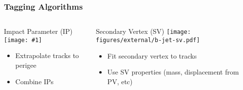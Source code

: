 \documentclass[usenames,dvipsnames]{beamer}
\newcommand{\widegraphic}[1]{\texttt{[image: \#1]}}
\begin{document}
\begin{frame}
  \frametitle{Tagging Algorithms}
  \begin{columns}[t]
    \begin{column}{0.5\textwidth}
      \begin{center}
        Impact Parameter (IP)
      \widegraphic{figures/external/b-jet-ip.pdf}
      \end{center}
      \begin{itemize}
      \item Extrapolate tracks to perigee
      \item Combine IPs
      \end{itemize}
    \end{column}
    \vline{}
    \begin{column}{0.5\textwidth}
      \begin{center}
        Secondary Vertex (SV)
      \texttt{[image: figures/external/b-jet-sv.pdf]}
        \end{center}
      \begin{itemize}
      \item Fit secondary vertex to tracks
      \item Use SV properties (mass, displacement from PV, etc)
      \end{itemize}
    \end{column}
  \end{columns}
\end{frame}
\end{document}
